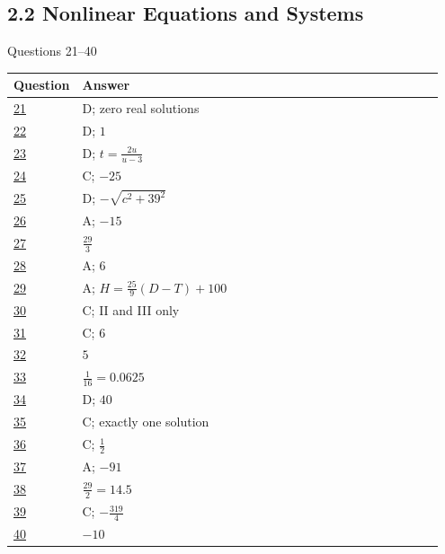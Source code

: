 \documentclass[11pt]{article}
\begin{document}
\subsection*{2.2 Nonlinear Equations and Systems}
{\small\color{NPgray}Questions 21--40}\par
\renewcommand{\arraystretch}{1.25}\begin{longtable}{@{}p{0.09\linewidth}p{0.86\linewidth}@{}}\toprule Question & Answer \\ \midrule\endhead
\hyperref[q44]{21} & D; zero real solutions\\
\hyperref[q45]{22} & D; $1$\\
\hyperref[q46]{23} & D; $t=\frac{2u}{u-3}$\\
\hyperref[q47]{24} & C; $-25$\\
\hyperref[q48]{25} & D; $-\sqrt{c^2+39^2}$\\
\hyperref[q49]{26} & A; $-15$\\
\hyperref[q50]{27} & $\frac{29}{3}$\\
\hyperref[q51]{28} & A; $6$\\
\hyperref[q52]{29} & A; $H=\frac{25}{9}(D-T)+100$\\
\hyperref[q53]{30} & C; II and III only\\
\hyperref[q54]{31} & C; $6$\\
\hyperref[q55]{32} & $5$\\
\hyperref[q56]{33} & $\frac1{16}=0.0625$\\
\hyperref[q57]{34} & D; $40$\\
\hyperref[q58]{35} & C; exactly one solution\\
\hyperref[q59]{36} & C; $\frac12$\\
\hyperref[q60]{37} & A; $-91$\\
\hyperref[q61]{38} & $\frac{29}{2}=14.5$\\
\hyperref[q62]{39} & C; $-\frac{319}{4}$\\
\hyperref[q63]{40} & $-10$\\
\bottomrule\end{longtable}
\clearpage
\end{document}
